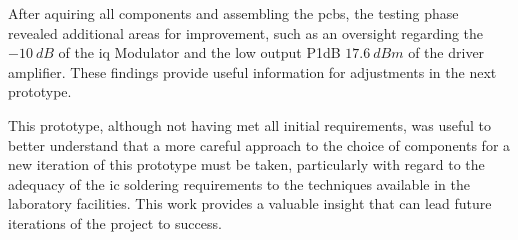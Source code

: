 \par After aquiring all components and assembling the \ac{pcb}s, the testing phase revealed additional areas for improvement, such as an oversight regarding the $-10\:\si{dB}$ of the \ac{iq} Modulator and the low output P1dB $17.6 \:\si{dBm}$ of the driver amplifier. These findings provide useful information for adjustments in the next prototype.

\par This prototype, although not having met all initial requirements, was useful to better understand that a more careful approach to the choice of components for a new iteration of this prototype must be taken, particularly with regard to the adequacy of the \ac{ic} soldering requirements to the techniques available in the laboratory facilities. This work provides a valuable insight that can lead future iterations of the project to success.